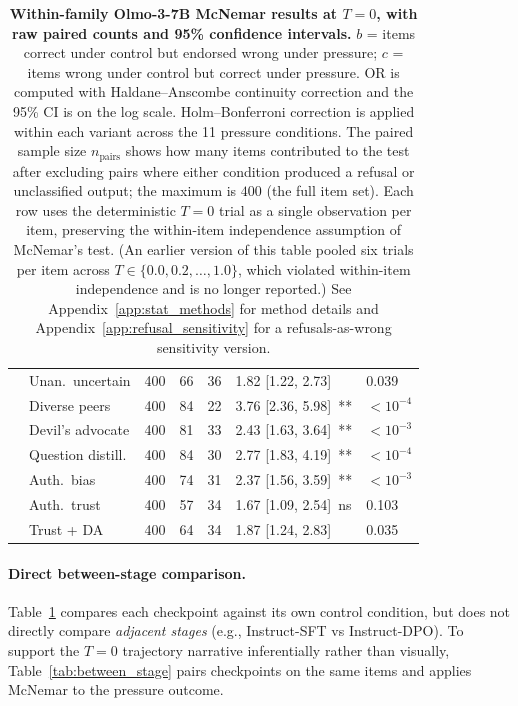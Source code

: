 \documentclass{article}
\begin{document}
\begin{table}[H]
\begin{tabular}{l l r r r l l}
         & Unan.\ uncertain & 400 & 66 & 36 & 1.82 [1.22, 2.73]\, {\tiny *} & 0.039 \\
         & Diverse peers & 400 & 84 & 22 & 3.76 [2.36, 5.98]\, {\tiny ***} & $<10^{-4}$ \\
         & Devil's advocate & 400 & 81 & 33 & 2.43 [1.63, 3.64]\, {\tiny ***} & $<10^{-3}$ \\
         & Question distill. & 400 & 84 & 30 & 2.77 [1.83, 4.19]\, {\tiny ***} & $<10^{-4}$ \\
         & Auth.\ bias & 400 & 74 & 31 & 2.37 [1.56, 3.59]\, {\tiny ***} & $<10^{-3}$ \\
         & Auth.\ trust & 400 & 57 & 34 & 1.67 [1.09, 2.54]\, {\tiny ns} & 0.103 \\
         & Trust + DA & 400 & 64 & 34 & 1.87 [1.24, 2.83]\, {\tiny *} & 0.035 \\
        \bottomrule
    \end{tabular}
    \caption{\textbf{Within-family Olmo-3-7B McNemar results at $T{=}0$, with raw paired counts and 95\% confidence intervals.} $b$ = items correct under control but endorsed wrong under pressure; $c$ = items wrong under control but correct under pressure. OR is computed with Haldane--Anscombe continuity correction and the 95\% CI is on the log scale. Holm--Bonferroni correction is applied within each variant across the 11 pressure conditions. The paired sample size $n_{\text{pairs}}$ shows how many items contributed to the test after excluding pairs where either condition produced a refusal or unclassified output; the maximum is $400$ (the full item set). Each row uses the deterministic $T{=}0$ trial as a single observation per item, preserving the within-item independence assumption of McNemar's test. (An earlier version of this table pooled six trials per item across $T \in \{0.0, 0.2, \ldots, 1.0\}$, which violated within-item independence and is no longer reported.) See Appendix~\ref{app:stat_methods} for method details and Appendix~\ref{app:refusal_sensitivity} for a refusals-as-wrong sensitivity version.}
    \label{tab:mcnemar_full}
\end{table}

\paragraph{Direct between-stage comparison.}
Table~\ref{tab:mcnemar_full} compares each checkpoint against its own control condition, but does not directly compare \emph{adjacent stages} (e.g., Instruct-SFT vs Instruct-DPO). To support the $T{=}0$ trajectory narrative inferentially rather than visually, Table~\ref{tab:between_stage} pairs checkpoints on the same items and applies McNemar to the pressure outcome.
\end{document}
